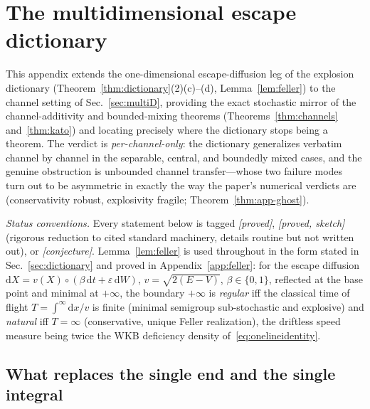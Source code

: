\documentclass[11pt]{article}
\theoremstyle{definition}
\theoremstyle{remark}
\newcommand{\dd}{\mathrm{d}}
\begin{document}
\section{The multidimensional escape dictionary}
\label{app:multiD}

This appendix extends the one-dimensional escape-diffusion leg of the
explosion dictionary (Theorem~\ref{thm:dictionary}(2)(c)--(d),
Lemma~\ref{lem:feller}) to the channel setting of
Sec.~\ref{sec:multiD}, providing the exact stochastic mirror of the
channel-additivity and bounded-mixing theorems
(Theorems~\ref{thm:channels} and~\ref{thm:kato}) and locating precisely
where the dictionary stops being a theorem. The verdict is
\emph{per-channel-only}: the dictionary generalizes verbatim channel by
channel in the separable, central, and boundedly mixed cases, and the
genuine obstruction is unbounded channel transfer---whose two failure
modes turn out to be asymmetric in exactly the way the paper's
numerical verdicts are (conservativity robust, explosivity
fragile; Theorem~\ref{thm:app-ghost}).

\emph{Status conventions.} Every statement below is tagged
\emph{[proved]}, \emph{[proved, sketch]} (rigorous reduction to cited
standard machinery, details routine but not written out), or
\emph{[conjecture]}. Lemma~\ref{lem:feller} is used throughout in the
form stated in Sec.~\ref{sec:dictionary} and proved in
Appendix~\ref{app:feller}: for the escape diffusion
$\dd X=v(X)\circ(\beta\,\dd t+\varepsilon\,\dd W)$,
$v=\sqrt{2(E-V)}$, $\beta\in\{0,1\}$, reflected at the base point and
minimal at $+\infty$, the boundary $+\infty$ is \emph{regular} iff the
classical time of flight $T=\int^{\infty}\dd x/v$ is finite (minimal
semigroup sub-stochastic and explosive) and \emph{natural} iff
$T=\infty$ (conservative, unique Feller realization), the driftless
speed measure being twice the WKB deficiency density
of~\eqref{eq:onelineidentity}.

\subsection{What replaces the single end and the single integral}
\label{app:multiD-setting}
\end{document}
